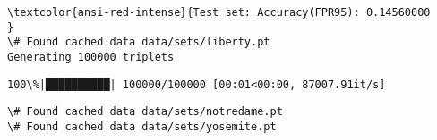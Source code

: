 \documentclass[11pt]{article}
\begin{document}
    \begin{Verbatim}[commandchars=\\\{\}]
\textcolor{ansi-red-intense}{Test set: Accuracy(FPR95): 0.14560000
}
\# Found cached data data/sets/liberty.pt
Generating 100000 triplets

    \end{Verbatim}

    \begin{Verbatim}[commandchars=\\\{\}]
100\%|██████████| 100000/100000 [00:01<00:00, 87007.91it/s]

    \end{Verbatim}

    \begin{Verbatim}[commandchars=\\\{\}]
\# Found cached data data/sets/notredame.pt
\# Found cached data data/sets/yosemite.pt

    \end{Verbatim}


    
    
    
    
\end{document}
